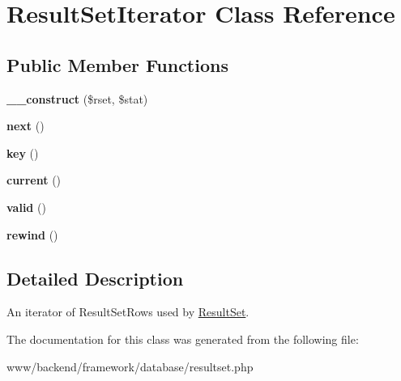 \hypertarget{classResultSetIterator}{
\section{ResultSetIterator Class Reference}
\label{classResultSetIterator}
}
\subsection*{Public Member Functions}
\begin{DoxyCompactItemize}
\item 
\hypertarget{classResultSetIterator_acb0cc487f8d0bc52b164335bd7691f1e}{
{\bfseries \_\-\_\-construct} (\$rset, \$stat)}
\label{classResultSetIterator_acb0cc487f8d0bc52b164335bd7691f1e}

\item 
\hypertarget{classResultSetIterator_a5ed2709915f0e61d008f62ac99f6d7d7}{
{\bfseries next} ()}
\label{classResultSetIterator_a5ed2709915f0e61d008f62ac99f6d7d7}

\item 
\hypertarget{classResultSetIterator_a4d31e6ec548912c7f725b9fa71df8b02}{
{\bfseries key} ()}
\label{classResultSetIterator_a4d31e6ec548912c7f725b9fa71df8b02}

\item 
\hypertarget{classResultSetIterator_a7eb652f50d47244c2f2090ad77cba6c3}{
{\bfseries current} ()}
\label{classResultSetIterator_a7eb652f50d47244c2f2090ad77cba6c3}

\item 
\hypertarget{classResultSetIterator_a1ddc5f382d17bc1fcc2d9740fa2acf2c}{
{\bfseries valid} ()}
\label{classResultSetIterator_a1ddc5f382d17bc1fcc2d9740fa2acf2c}

\item 
\hypertarget{classResultSetIterator_aa93d51d5866155c4eacea03f8856c54c}{
{\bfseries rewind} ()}
\label{classResultSetIterator_aa93d51d5866155c4eacea03f8856c54c}

\end{DoxyCompactItemize}


\subsection{Detailed Description}
An iterator of ResultSetRows used by \hyperlink{classResultSet}{ResultSet}. 

The documentation for this class was generated from the following file:\begin{DoxyCompactItemize}
\item 
www/backend/framework/database/resultset.php\end{DoxyCompactItemize}
